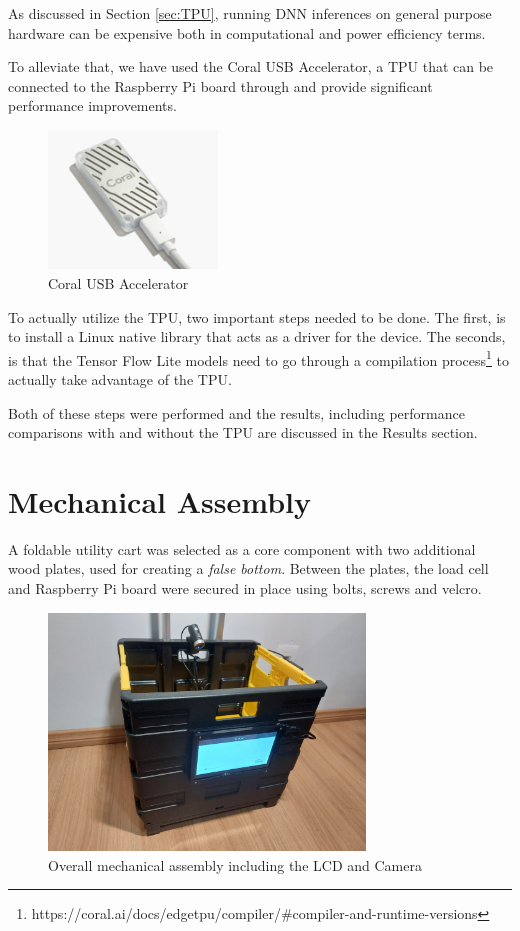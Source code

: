 \documentclass[openright]{normas-utf-tex} %
\begin{document}
As discussed in Section \ref{sec:TPU}, running DNN inferences on general purpose hardware can be expensive
both in computational and power efficiency terms. 

To alleviate that, we have used the Coral USB Accelerator, a TPU that can be
connected to the Raspberry Pi board through 
and provide significant performance improvements.

\begin{figure}[H]
	\centering
	\includegraphics[width=0.4\textwidth]{./images/coralusb.png}
	\caption[Coral USB Accelerator]{Coral USB Accelerator}
\end{figure}

To actually utilize the TPU, two important steps needed to be done. The first, is to install
a Linux native library that acts as a driver for the device. The seconds, is that the Tensor Flow Lite 
models need to go through a compilation process\footnote{https://coral.ai/docs/edgetpu/compiler/\#compiler-and-runtime-versions} to actually take advantage of the TPU.

Both of these steps were performed and the results, including performance comparisons 
with and without the TPU are discussed in the Results section.

\section{Mechanical Assembly}

A foldable utility cart was selected as a core
component with two additional wood plates, used for creating a \textit{false
bottom}. Between the plates, the load cell and Raspberry Pi board were secured
in place using bolts, screws and velcro.

\begin{figure}[H]
	\centering
	\includegraphics[width=0.75\textwidth]{./images/cart.jpeg}
	\caption[Overall mechanical assembly including the LCD and Camera]{Overall mechanical assembly including the LCD and Camera}
\end{figure}
\end{document}
